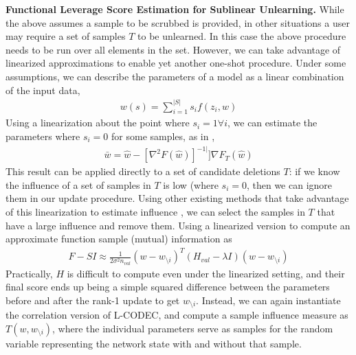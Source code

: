 {\bf Functional Leverage Score Estimation for Sublinear Unlearning.}
While the above assumes a sample to be scrubbed is provided, in other situations a user may require a set of samples $T$ to be unlearned. In this case the above procedure needs to be run over all elements in the set. 
However, we can take advantage of linearized approximations to enable yet another one-shot procedure.
Under some assumptions, we can describe the parameters of a model as a linear combination of the input data,
\begin{align}
    w(s) = \sum_{i=1}^{|S|} s_i f(z_i, w)
\end{align}
Using a linearization about the point where $s_i = 1 \forall i$, we can estimate the parameters where $s_i = 0$ for some samples, as in \cite{koh2017understanding},
\begin{align}
    \bar{w} = \hat{w} - [\nabla^2 F(\hat{w})]^{-1|}] \nabla F_T (\hat{w}) 
\end{align}
This result can be applied directly to a set of candidate deletions $T$: if we know the influence of a set of samples in $T$ is low (where $s_i=0$, then we can ignore them in our update procedure. Using other existing methods that take advantage of this linearization to estimate influence \cite{harutyunyan2021estimating}, we can select the samples in $T$ that have a large influence and remove them.
Using a linearized version to compute an approximate function sample (mutual) information as 
\begin{align}
    F-SI \approx \frac{1}{2\sigma^2 n_{val}} (w - w_{\setminus i})^T (H_{val} - \lambda I) (w - w_{\setminus i})
\end{align}
Practically, $H$ is difficult to compute even under the linearized setting, and their final score ends up being a simple squared difference between the parameters before and after the rank-1 update to get $w_{\setminus i}$.
Instead, we can again instantiate the correlation version of L-CODEC, and compute a sample influence measure as $T(w, w_{\setminus i})$, where the individual parameters serve as samples for the random variable representing the network state with and without that sample.

